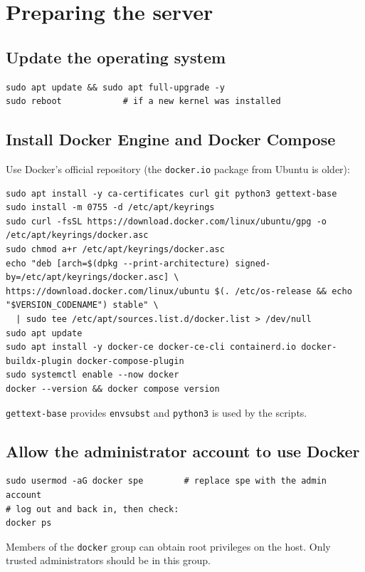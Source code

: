 \documentclass[11pt,a4paper]{report}
\newcommand{\code}[1]{\texttt{\small #1}}
\begin{document}
\chapter{Preparing the server}\label{ch:host}

\section{Update the operating system}
\begin{lstlisting}
sudo apt update && sudo apt full-upgrade -y
sudo reboot            # if a new kernel was installed
\end{lstlisting}

\section{Install Docker Engine and Docker Compose}
Use Docker's official repository (the \code{docker.io} package from Ubuntu is older):
\begin{lstlisting}
sudo apt install -y ca-certificates curl git python3 gettext-base
sudo install -m 0755 -d /etc/apt/keyrings
sudo curl -fsSL https://download.docker.com/linux/ubuntu/gpg -o /etc/apt/keyrings/docker.asc
sudo chmod a+r /etc/apt/keyrings/docker.asc
echo "deb [arch=$(dpkg --print-architecture) signed-by=/etc/apt/keyrings/docker.asc] \
https://download.docker.com/linux/ubuntu $(. /etc/os-release && echo "$VERSION_CODENAME") stable" \
  | sudo tee /etc/apt/sources.list.d/docker.list > /dev/null
sudo apt update
sudo apt install -y docker-ce docker-ce-cli containerd.io docker-buildx-plugin docker-compose-plugin
sudo systemctl enable --now docker
docker --version && docker compose version
\end{lstlisting}
\code{gettext-base} provides \code{envsubst} and \code{python3} is used by the scripts.

\section{Allow the administrator account to use Docker}
\begin{lstlisting}
sudo usermod -aG docker spe        # replace spe with the admin account
# log out and back in, then check:
docker ps
\end{lstlisting}
\begin{warning}
Members of the \code{docker} group can obtain root privileges on the host. Only trusted
administrators should be in this group.
\end{warning}
\end{document}
